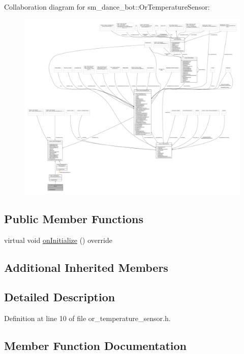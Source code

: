 Collaboration diagram for sm\+\_\+dance\+\_\+bot\+:\+:Or\+Temperature\+Sensor\+:
\nopagebreak
\begin{figure}[H]
\begin{center}
\leavevmode
\includegraphics[width=350pt]{classsm__dance__bot_1_1OrTemperatureSensor__coll__graph}
\end{center}
\end{figure}
\subsection*{Public Member Functions}
\begin{DoxyCompactItemize}
\item 
virtual void \hyperlink{classsm__dance__bot_1_1OrTemperatureSensor_a2e944e459a695774dcf7fdbd5ac93b01}{on\+Initialize} () override
\end{DoxyCompactItemize}
\subsection*{Additional Inherited Members}


\subsection{Detailed Description}


Definition at line 10 of file or\+\_\+temperature\+\_\+sensor.\+h.



\subsection{Member Function Documentation}
\mbox{\label{classsm__dance__bot_1_1OrTemperatureSensor_a2e944e459a695774dcf7fdbd5ac93b01}} 
